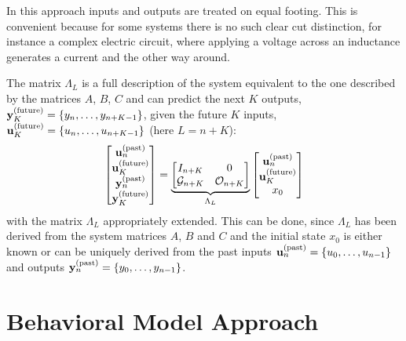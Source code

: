 In this approach inputs and outputs are treated on equal footing. This is convenient because for some systems there is no such clear cut distinction, for instance a complex electric circuit, where applying a voltage across an inductance generates a current and the other way around.

The matrix $\Lambda_L$ is a full description of the system equivalent to the one described by the matrices $A$, $B$, $C$ and can predict the next $K$ outputs, $\boldsymbol{\mathrm{y}}_K^{(\textrm{future})} = \{y_n,\ldots,y_{n+K-1}\}$, given the future $K$ inputs, $\boldsymbol{\mathrm{u}}_K^{(\textrm{future})} = \{u_n,\ldots,u_{n+K-1}\}$ (here $L=n+K$):
\begin{equation*}
  \begin{bmatrix}
    \boldsymbol{\mathrm{u}}_n^{(\textrm{past})} \\ \boldsymbol{\mathrm{u}}_K^{(\textrm{future})} \\ \boldsymbol{\mathrm{y}}_n^{(\textrm{past})} \\ \boldsymbol{\mathrm{y}}_K^{(\textrm{future})}
  \end{bmatrix} = \underbrace{
  \begin{bmatrix}
    I_{n+K} & 0 \\ \mathcal{G}_{n+K} & \mathcal{O}_{n+K}
  \end{bmatrix}}_{\Lambda_L}
  \begin{bmatrix}
    \boldsymbol{\mathrm{u}}_n^{(\textrm{past})} \\ \boldsymbol{\mathrm{u}}_K^{(\textrm{future})} \\ x_0
  \end{bmatrix}
\end{equation*}
with the matrix $\Lambda_L$ appropriately extended. This can be done, since $\Lambda_L$ has been derived from the system matrices $A$, $B$ and $C$ and the initial state $x_0$ is either known or can be uniquely derived from the past inputs $\boldsymbol{\mathrm{u}}_n^{(\textrm{past})} = \{u_0,\ldots,u_{n-1}\}$ and outputs $\boldsymbol{\mathrm{y}}_n^{(\textrm{past})} = \{y_0,\ldots,y_{n-1}\}$.

\section{Behavioral Model Approach}
\label{sec:behavioral-model-approach}

